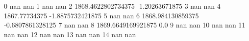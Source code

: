 0 nan nan
1 nan nan
2 1868.4622802734375 -1.20263671875
3 nan nan
4 1867.77734375 -1.8875732421875
5 nan nan
6 1868.984130859375 -0.6807861328125
7 nan nan
8 1869.6649169921875 0.0
9 nan nan
10 nan nan
11 nan nan
12 nan nan
13 nan nan
14 nan nan
